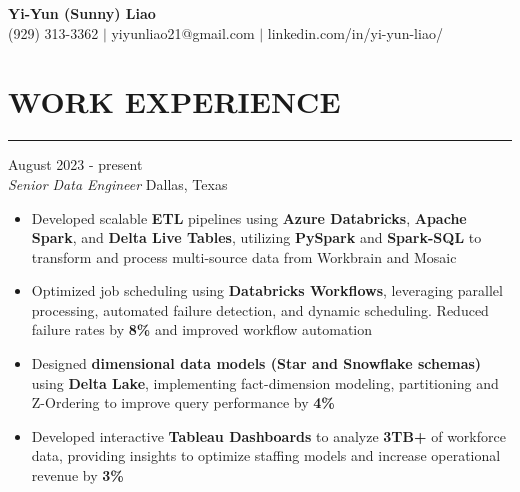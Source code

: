 \documentclass[11pt,letterpaper]{article}
\begin{document}
\begin{center}
  {\Large\textbf{Yi-Yun (Sunny) Liao}}\\[-2pt]
  (929) 313-3362 $|$ yiyunliao21@gmail.com $|$ linkedin.com/in/yi-yun-liao/
\end{center}

\vspace{-2pt}
\section*{WORK EXPERIENCE}
\vspace{-6pt}\noindent\rule{\textwidth}{0.8pt}

\vspace{2pt}
 \hfill August 2023 - present\\[-1pt]
\textit{Senior Data Engineer} \hfill Dallas, Texas
\begin{itemize}[leftmargin=1.5em, rightmargin=0pt, itemsep=-1pt, topsep=-1pt, parsep=0pt]
  \item \justifying Developed scalable \textbf{ETL} pipelines using \textbf{Azure Databricks}, \textbf{Apache Spark}, and \textbf{Delta Live Tables}, utilizing \textbf{PySpark} and \textbf{Spark-SQL} to transform and process multi-source data from Workbrain and Mosaic
  \item \justifying Optimized job scheduling using \textbf{Databricks Workflows}, leveraging parallel processing, automated failure detection, and dynamic scheduling. Reduced failure rates by \textbf{8\%} and improved workflow automation
  \item \justifying Designed \textbf{dimensional data models (Star and Snowflake schemas)} using \textbf{Delta Lake}, implementing fact-dimension modeling, partitioning and Z-Ordering to improve query performance by \textbf{4\%}
  \item \justifying Developed interactive \textbf{Tableau Dashboards} to analyze \textbf{3TB+} of workforce data, providing insights to optimize staffing models and increase operational revenue by \textbf{3\%}
\end{itemize}
\end{document}
